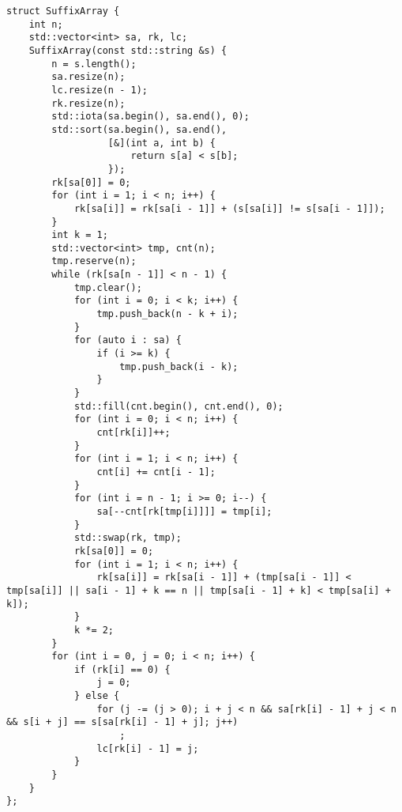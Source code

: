 \documentclass[a4paper,10pt]{article}
\begin{document}
\noindent\begin{lstlisting}
struct SuffixArray {
    int n;
    std::vector<int> sa, rk, lc;
    SuffixArray(const std::string &s) {
        n = s.length();
        sa.resize(n);
        lc.resize(n - 1);
        rk.resize(n);
        std::iota(sa.begin(), sa.end(), 0);
        std::sort(sa.begin(), sa.end(),
                  [&](int a, int b) {
                      return s[a] < s[b];
                  });
        rk[sa[0]] = 0;
        for (int i = 1; i < n; i++) {
            rk[sa[i]] = rk[sa[i - 1]] + (s[sa[i]] != s[sa[i - 1]]);
        }
        int k = 1;
        std::vector<int> tmp, cnt(n);
        tmp.reserve(n);
        while (rk[sa[n - 1]] < n - 1) {
            tmp.clear();
            for (int i = 0; i < k; i++) {
                tmp.push_back(n - k + i);
            }
            for (auto i : sa) {
                if (i >= k) {
                    tmp.push_back(i - k);
                }
            }
            std::fill(cnt.begin(), cnt.end(), 0);
            for (int i = 0; i < n; i++) {
                cnt[rk[i]]++;
            }
            for (int i = 1; i < n; i++) {
                cnt[i] += cnt[i - 1];
            }
            for (int i = n - 1; i >= 0; i--) {
                sa[--cnt[rk[tmp[i]]]] = tmp[i];
            }
            std::swap(rk, tmp);
            rk[sa[0]] = 0;
            for (int i = 1; i < n; i++) {
                rk[sa[i]] = rk[sa[i - 1]] + (tmp[sa[i - 1]] < tmp[sa[i]] || sa[i - 1] + k == n || tmp[sa[i - 1] + k] < tmp[sa[i] + k]);
            }
            k *= 2;
        }
        for (int i = 0, j = 0; i < n; i++) {
            if (rk[i] == 0) {
                j = 0;
            } else {
                for (j -= (j > 0); i + j < n && sa[rk[i] - 1] + j < n && s[i + j] == s[sa[rk[i] - 1] + j]; j++)
                    ;
                lc[rk[i] - 1] = j;
            }
        }
    }
};


\end{lstlisting}
\end{document}
